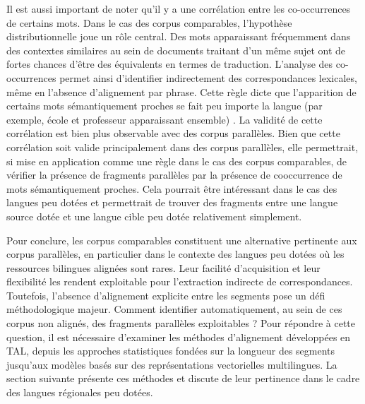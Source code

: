 Il est aussi important de noter qu'il y a une corrélation entre les co-occurrences de certains mots.
Dans le cas des corpus comparables, l’hypothèse distributionnelle joue un rôle central.
Des mots apparaissant fréquemment dans des contextes similaires au sein de documents traitant
d’un même sujet ont de fortes chances d’être des équivalents en termes de traduction.
L’analyse des co-occurrences permet ainsi d’identifier indirectement des correspondances
lexicales, même en l’absence d’alignement par phrase.
Cette règle dicte que l'apparition de certains mots sémantiquement proches se fait peu importe la langue
(par exemple, école et professeur apparaissant ensemble) \citep{rapp_1995}.
La validité de cette corrélation est bien plus observable avec des corpus parallèles\citep{sharoff_2013a}.
Bien que cette corrélation soit valide principalement dans des corpus parallèles, elle permettrait, si mise en application
comme une règle dans le cas des corpus comparables,
de vérifier la présence de fragments parallèles par la présence de cooccurrence de mots sémantiquement proches.
Cela pourrait être intéressant dans le cas des langues peu dotées et permettrait de trouver des fragments
entre une langue source dotée et une langue cible peu dotée relativement simplement.

Pour conclure, les corpus comparables constituent une alternative pertinente aux corpus
parallèles, en particulier dans le contexte des langues peu dotées où les ressources bilingues
alignées sont rares. Leur facilité d’acquisition et leur flexibilité les rendent
exploitable pour l’extraction indirecte de correspondances.
Toutefois, l’absence d’alignement explicite entre les segments pose un défi méthodologique
majeur. Comment identifier automatiquement, au sein de ces corpus non alignés, des fragments
parallèles exploitables{ ?}
Pour répondre à cette question, il est nécessaire d’examiner les méthodes d’alignement
développées en TAL, depuis les approches statistiques fondées
sur la longueur des segments jusqu’aux modèles basés sur des représentations
vectorielles multilingues. La section suivante présente ces méthodes et discute de leur pertinence
dans le cadre des langues régionales peu dotées.